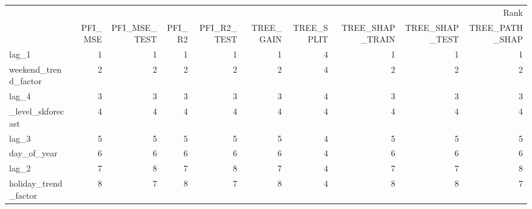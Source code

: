 \begin{tabular}{lrrrrrrrrr}
\toprule
 & \multicolumn{9}{r}{Rank} \\
 & PFI_MSE & PFI_MSE_TEST & PFI_R2 & PFI_R2_TEST & TREE_GAIN & TREE_SPLIT & TREE_SHAP_TRAIN & TREE_SHAP_TEST & TREE_PATH_SHAP \\
\midrule
lag_1 & 1 & 1 & 1 & 1 & 1 & 4 & 1 & 1 & 1 \\
weekend_trend_factor & 2 & 2 & 2 & 2 & 2 & 4 & 2 & 2 & 2 \\
lag_4 & 3 & 3 & 3 & 3 & 3 & 4 & 3 & 3 & 3 \\
_level_skforecast & 4 & 4 & 4 & 4 & 4 & 4 & 4 & 4 & 4 \\
lag_3 & 5 & 5 & 5 & 5 & 5 & 4 & 5 & 5 & 5 \\
day_of_year & 6 & 6 & 6 & 6 & 6 & 4 & 6 & 6 & 6 \\
lag_2 & 7 & 8 & 7 & 8 & 7 & 4 & 7 & 7 & 8 \\
holiday_trend_factor & 8 & 7 & 8 & 7 & 8 & 4 & 8 & 8 & 7 \\
\bottomrule
\end{tabular}
